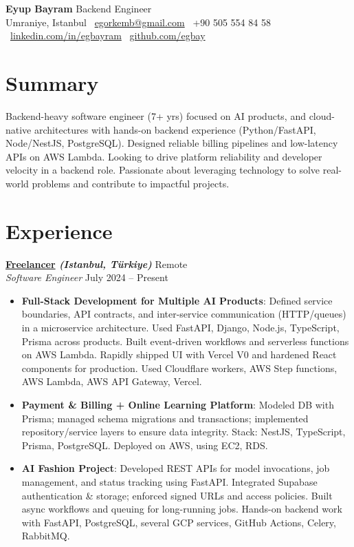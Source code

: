 \documentclass[10pt,a4paper]{extarticle}
\begin{document}
\begin{center}
  \begin{minipage}{\textwidth}
    \centering
    {\LARGE\textbf{Eyup Bayram}} \hspace{2pt} {\LARGE Backend Engineer}\\[8pt]
    Umraniye, Istanbul \textbullet\ 
    \href{mailto:egorkemb@gmail.com}{egorkemb@gmail.com} \textbullet\
    +90 505 554 84 58 \textbullet\
    \href{https://linkedin.com/in/egbayram}{linkedin.com/in/egbayram} \textbullet\
    \href{https://github.com/egbay}{github.com/egbay}
  \end{minipage}
\end{center}

\section{Summary}
Backend-heavy software engineer (7+ yrs) focused on AI products, and cloud-native architectures with hands-on backend experience (Python/FastAPI, Node/NestJS, PostgreSQL). Designed reliable billing pipelines and low-latency APIs on AWS Lambda. Looking to drive platform reliability and developer velocity in a backend role. Passionate about leveraging technology to solve real-world problems and contribute to impactful projects. 

\section{Experience}
\textbf{\href{https://linkedin.com/in/egbayram}{Freelancer} \textit{(Istanbul, Türkiye)}} \hfill Remote\\
\textit{Software Engineer} \hfill July 2024 -- Present
\begin{itemize}[leftmargin=*,noitemsep,topsep=0pt]
    \item \textbf{Full-Stack Development for Multiple AI Products}: Defined service boundaries, API contracts, and inter-service communication (HTTP/queues) in a microservice architecture. Used FastAPI, Django, Node.js, TypeScript, Prisma across products. Built event-driven workflows and serverless functions on AWS Lambda. Rapidly shipped UI with Vercel V0 and hardened React components for production. Used Cloudflare workers, AWS Step functions, AWS Lambda, AWS API Gateway, Vercel. 
    \item \textbf{Payment \& Billing + Online Learning Platform}: Modeled DB with Prisma; managed schema migrations and transactions; implemented repository/service layers to ensure data integrity. Stack: NestJS, TypeScript, Prisma, PostgreSQL. Deployed on AWS, using EC2, RDS. 
    \item \textbf{AI Fashion Project}: Developed REST APIs for model invocations, job management, and status tracking using FastAPI. Integrated Supabase authentication \& storage; enforced signed URLs and access policies. Built async workflows and queuing for long-running jobs. Hands-on backend work with FastAPI, PostgreSQL, several GCP services, GitHub Actions, Celery, RabbitMQ.
\end{itemize}
\end{document}
